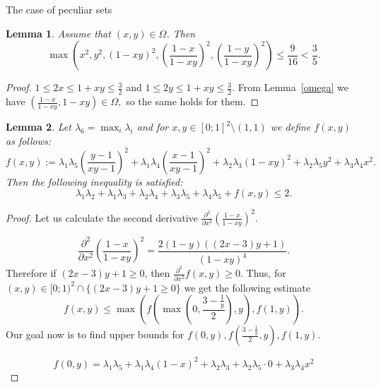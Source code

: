 \documentclass[12pt]{article}
\newtheorem{lemma}{Lemma}[section]
\begin{document}
\begin{section}{ The case of peculiar sets}
    \begin{lemma}
    \label{lemma7.2}
        Assume that  $(x,y)\in \Omega$. Then 
        $$
            \max \left(x^{2},y^{2},(1-xy)^{2}, \left(\frac{1-x}{1-xy}\right)^{2}, \left(\frac{1-y}{1-xy}\right)^{2}\right)\leq \frac{9}{16} < \frac{3}{5}.
        $$
    \end{lemma}
    
    \begin{proof}
        $1\leq 2x \leq 1 + xy \leq \frac{3}{2}$ and  $1\leq 2y \leq 1 + xy \leq \frac{3}{2}$.   From Lemma~\ref{omega} we have $  \left(\frac{1-x}{1-xy}, 1-xy\right ) \in \Omega, $ so the same holds for them. 
        
    \end{proof}

    \begin{lemma}
    \label{lemma7.3}
    Let $\lambda_{6} = \max_{i}\lambda_{i}$ and for $x,y \in [0;1]^{2}\setminus(1,1)$ we define $f(x,y)$ as follows:
        $$
            f(x,y) := \lambda_{1}\lambda_{5}\left(\frac{y-1}{xy-1}\right)^2 + \lambda_{1}\lambda_{4} \left(\frac{x-1}{xy-1}\right)^2 + \lambda_{2}\lambda_{3}(1-xy)^2 + \lambda_{2}\lambda_{5}y^{2} + \lambda_{3}\lambda_{4}x^{2} .
        $$
        Then the following inequality is satisfied:
        $$
            \lambda_{1}\lambda_{2} + \lambda_{1}\lambda_{3} +  \lambda_{2}\lambda_{4} + \lambda_{3}\lambda_{5} + \lambda_{4}\lambda_{5} + f(x,y) \leq 2. 
        $$
    \end{lemma}

    \begin{proof}
              Let us calculate the second derivative $\frac{\partial^{2}}{\partial x^2}\left(\frac{1-x}{1-xy}\right)^2$. 

        $$
            \frac{\partial^{2}}{\partial x^2}\left(\frac{1-x}{1-xy}\right)^2 = \frac{2(1-y)((2x-3)y + 1)}{(1-xy)^4}.
        $$
        Therefore if $(2x-3)y+1\geq 0$, then $\frac{\partial^{2}}{\partial x^2}f(x,y)\geq 0$. Thus, for $(x,y) \in [0;1)^2 \cap \{(2x-3)y + 1\geq 0\}$ we get the following estimate
        $$
            f(x,y)\leq \max \left(f\left(\max\left(0,\frac{3-\frac{1}{y}}{2}\right), y\right), f(1,y)\right).
        $$
        Our goal now is to find upper bounds for $f(0,y),f\left(\frac{3-\frac{1}{y}}{2},y\right),f(1,y).$ 

        $$
            f(0,y) = \lambda_{1}\lambda_{5} + \lambda_{1}\lambda_{4} (1-x)^2 + \lambda_{2}\lambda_{3} + \lambda_{2}\lambda_{5}\cdot 0 + \lambda_{3}\lambda_{4}x^{2} 
        $$


\end{proof}
\end{section}
\end{document}
